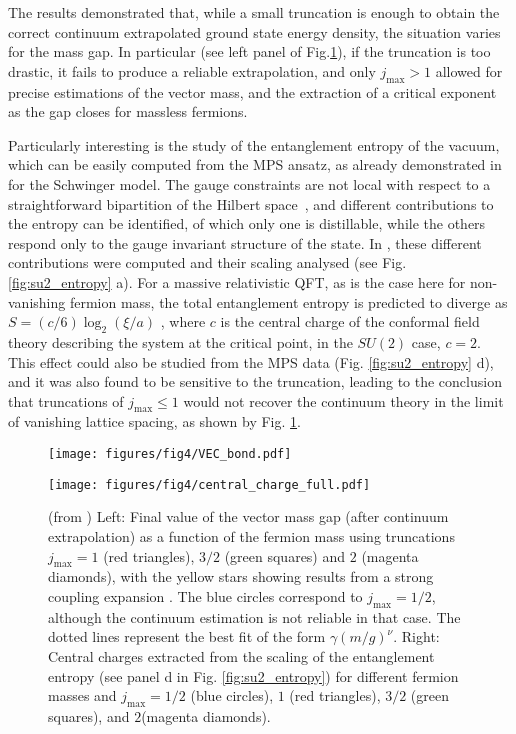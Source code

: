 \documentclass[epj,final]{svjour}
\begin{document}
The results demonstrated that, while a small truncation is enough to obtain the correct continuum extrapolated  ground state energy density, the situation varies for the mass gap. In particular (see left panel of  Fig.\ref{fig:su2_cont}), if the truncation is too drastic, it fails to produce a reliable extrapolation, and only $j_{\mathrm{max}}>1$ allowed for precise estimations of the vector mass, and the extraction of a critical exponent as the gap closes for massless fermions.

Particularly interesting is the study of the entanglement entropy of the vacuum, which can be easily computed from the MPS ansatz, as already demonstrated in \cite{Buyens2015} for the Schwinger model. The gauge constraints are not local with respect to a straightforward bipartition of the Hilbert space~\cite{ghosh2015entanglement,van2016entanglement}, and different contributions to the entropy can be identified, of which only one is distillable, while the others respond only to the gauge invariant structure of the state. In \cite{banuls2017efficient}, these different contributions were computed and their scaling analysed (see Fig. \ref{fig:su2_entropy} a). For a massive relativistic QFT, as is the case here for non-vanishing fermion mass, the total entanglement entropy is predicted to diverge as $S=(c/6)\log_2(\xi/a)$ \cite{calabrese2004entanglement}, where $c$  is the central charge of the conformal field theory describing the system at the critical point, in the $SU(2)$ case, $c=2$. This effect could also be studied from the MPS data (Fig. \ref{fig:su2_entropy} d), and it was also found to be sensitive to the truncation, leading to the conclusion that truncations of $j_{\mathrm{max}}\leq 1$  would not recover the continuum theory in the limit of vanishing lattice spacing, as shown by Fig. \ref{fig:su2_cont}.

\begin{figure}
\begin{minipage}[c]{.48\columnwidth}
\texttt{[image: figures/fig4/VEC\_bond.pdf]} 
\end{minipage}
\begin{minipage}[c]{.48\columnwidth}
\texttt{[image: figures/fig4/central\_charge\_full.pdf]}
\end{minipage}
\caption{(from \cite{banuls2017efficient})
Left: Final value of the vector mass gap (after continuum extrapolation) as a function of the fermion mass using truncations $j_{\mathrm{max}}=1$ (red triangles), $3/2$ (green squares) and $2$ (magenta diamonds), with the yellow stars showing results from a strong coupling expansion \cite{Hamer1982a}. The blue circles correspond to $j_{\mathrm{max}}=1/2$, although the continuum estimation is not reliable in that case. The dotted lines represent the best fit of the form $\gamma (m/g)^\nu$. Right: Central charges extracted from the scaling of the entanglement entropy (see panel d in Fig. \ref{fig:su2_entropy}) for different fermion masses and $j_{\mathrm{max}}=1/2$ (blue circles), $1$ (red triangles), $3/2$ (green squares), and $2$(magenta diamonds). }
\label{fig:su2_cont}
\end{figure}
\end{document}
